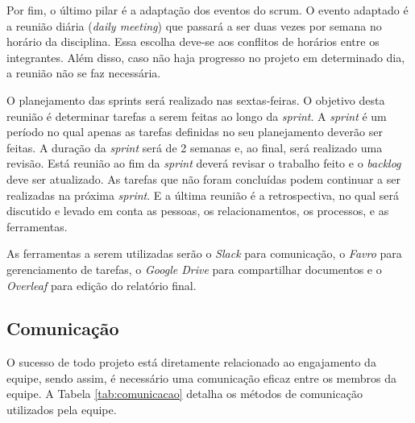 Por fim, o último pilar é a adaptação dos eventos do scrum. O evento adaptado é a reunião diária (\textit{daily meeting}) que passará a ser duas vezes por semana no horário da disciplina. Essa escolha deve-se aos conflitos de horários entre os integrantes. Além disso, caso não haja progresso no projeto em determinado dia, a reunião não se faz necessária.

	O planejamento das sprints será realizado nas sextas-feiras. O objetivo desta reunião é determinar tarefas a serem feitas ao longo da \textit{sprint}. A \textit{sprint} é um período no qual apenas as tarefas definidas no seu planejamento deverão ser feitas. A duração da \textit{sprint} será de 2 semanas e, ao final, será realizado uma revisão. Está reunião ao fim da \textit{sprint} deverá revisar o trabalho feito e o \textit{backlog} deve ser atualizado. As tarefas que não foram concluídas podem continuar a ser realizadas na próxima \textit{sprint}. E a última reunião é a retrospectiva, no qual será discutido e levado em conta as pessoas, os relacionamentos, os processos, e as ferramentas.
    
    As ferramentas a serem utilizadas serão o \textit{Slack} para comunicação, o \textit{Favro} para gerenciamento de tarefas, o \textit{Google Drive} para compartilhar  documentos e o \textit{Overleaf} para edição do relatório final.


\subsection{Comunicação}

O sucesso de todo projeto está diretamente relacionado ao engajamento da equipe, sendo assim, é necessário uma comunicação eficaz entre os membros da equipe. A Tabela \ref{tab:comunicacao} detalha os métodos de comunicação utilizados pela equipe.

\begin{table}[H]
\centering
\caption{Métodos de comunicação.}
\label{tab:comunicacao}
\end{table}



